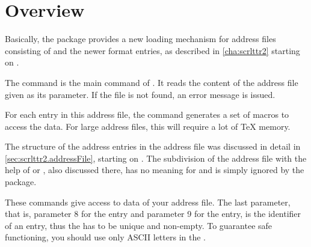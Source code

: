 \section{Overview}
Basically, the package provides a new loading mechanism for address files
consisting of  and the newer
 format entries, as described in
\autoref{cha:scrlttr2} starting on .

\begin{Declaration}
\end{Declaration}%
The  command is the main command of .
It reads the content of the address file given as its
parameter. If the file is not found, an error message is issued.

For each entry in this address file, the command generates a set of
macros to access the data. For large address files, this will require
a lot of \TeX{} memory.
%
\EndIndexGroup

\begin{Declaration}%
\end{Declaration}%
The structure of the address entries in the address file was discussed in
detail in \autoref{sec:scrlttr2.addressFile}, starting on
. The subdivision of the address file with
the help of  or , also discussed there, has no
meaning for  and is simply ignored by the package.%
\EndIndexGroup

\begin{Declaration}
\end{Declaration}%
These commands give access to data of your address file. The last parameter,
that is, parameter 8 for the  entry and
parameter 9 for the  entry, is the
identifier of an entry, thus the  has to be unique and non-empty.
To guarantee safe functioning, you should use only ASCII letters in the
.

